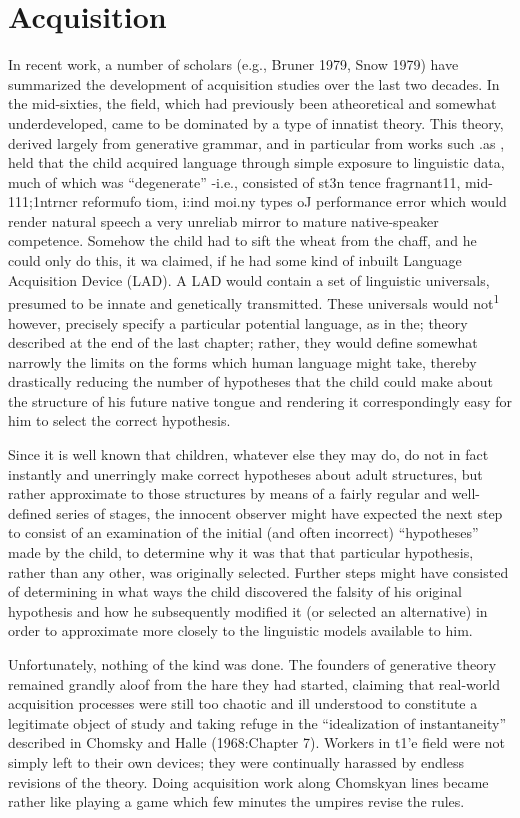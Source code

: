 \chapter{Acquisition} \label{ch:3}

In recent work, a number of scholars (e.g., Bruner 1979, Snow 1979) have summarized the development of acquisition studies over the last two decades. In the mid-sixties, the field, which had previously been atheoretical and somewhat underdeveloped, came to be domi\-nated by a type of innatist theory. This theory, derived largely from generative grammar, and in particular from works such .as \citet{Chomsky1962}, held that the child acquired language through simple exposure to linguistic data, much of which was ``degenerate'' -i.e., consisted of st3n tence fragrnant11, mid-111;1ntrncr reformufo tiom, i:ind moi.ny types oJ performance error which would render natural speech a very unreliab mirror to mature native-speaker competence. Somehow the child had to sift the wheat from the chaff, and he could only do this, it wa claimed, if he had some kind of inbuilt Language Acquisition Device (LAD). A LAD would contain a set of linguistic universals, presumed to be innate and genetically transmitted. These universals would not\textsuperscript{1} however, precisely specify a particular potential language, as in the; theory described at the end of the last chapter; rather, they would de\-fine somewhat narrowly the limits on the forms which human language might take, thereby drastically reducing the number of hypotheses
that the child could make about the structure of his future native tongue and rendering it correspondingly easy for him to select the correct hypothesis.

Since it is well known that children, whatever else they may do, do not in fact instantly and unerringly make correct hypotheses about adult structures, but rather approximate to those structures by means of a fairly regular and well-defined series of stages, the innocent observer might have expected the next step to consist of an examination of the initial (and often incorrect) ``hypotheses'' made by the child, to determine why it was that that particular hypothesis, rather than any other, was originally selected. Further steps might have consisted of determining in what ways the child discovered the falsity of his original hypothesis and how he subsequently modified it (or selected an alternative) in order to approximate more closely to the linguistic models available to him.

Unfortunately, nothing of the kind was done. The founders of generative theory remained grandly aloof from the hare they had started, claiming that real-world acquisition processes were still too chaotic and ill understood to constitute a legitimate object of study and taking refuge in the ``idealization of instantaneity'' described in Chomsky and Halle (1968:Chapter 7). Workers in t1'e field were not simply left to their own devices; they were continually harassed by endless revisions of the theory. Doing acquisition work along Chom\-skyan lines became rather like playing a game which few minutes the umpires revise the rules.

